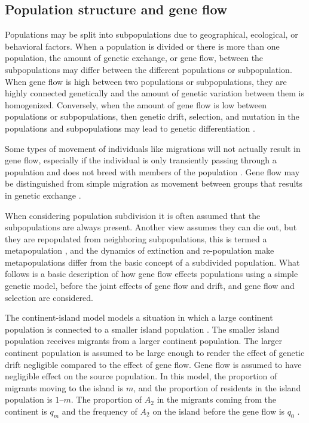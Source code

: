 \subsection{Population structure and gene flow}
\label{sec:Gflow}

Populations may be split into subpopulations due to geographical, ecological, or behavioral factors.
When a population is divided or there is more than one population, the amount of genetic exchange, or gene flow, between the subpopulations may differ between the different populations or subpopulation.
When gene flow is high between two populations or subpopulations, they are highly connected genetically and the amount of genetic variation between them is homogenized.
Conversely, when the amount of gene flow is low between populations or subpopulations, then genetic drift, selection, and mutation in the populations and subpopulations may lead to genetic differentiation \parencite{Charlesworth2010,Hedrick2010}.

Some types of movement of individuals like migrations will not actually result in gene flow, especially if the individual is only transiently passing through a population and does not breed with members of the population \parencite{Hedrick2010}.
Gene flow may be distinguished from simple migration as movement between groups that results in genetic exchange \parencite{Endler1977}.

When considering population subdivision it is often assumed that the subpopulations are always present.
Another view assumes they can die out, but they are repopulated from neighboring subpopulations, this is termed a metapopulation \parencite{Hanski1998}, and the dynamics of extinction and re-population make metapopulations differ from the basic concept of a subdivided population. What follows is a basic description of how gene flow effects populations using a simple genetic model, before the joint effects of gene flow and drift, and gene flow and selection are considered.

The continent-island model models a situation in which a large continent population is connected to a smaller island population \parencite{Charlesworth2010}.
The smaller island population receives migrants from a larger continent population.
The larger continent population is assumed to be large enough to render the effect of genetic drift negligible compared to the effect of gene flow.
Gene flow is assumed to have negligible effect on the source population. 
In this model, the proportion of migrants moving to the island is $m$, and the proportion of residents in the island population is $1 – m$.
The proportion of $A_2$ in the migrants coming from the continent is $q_m$ and the frequency of $A_2$ on the island before the gene flow is $q_0$ \parencite{Hedrick2010}.

